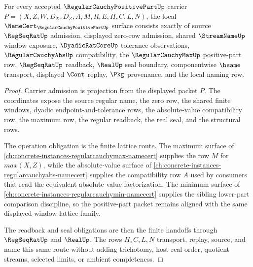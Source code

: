 \begin{theorem}
\label{thm:regular-cauchy-positive-part-namecert-obligations}
For every accepted $\RegularCauchyPositivePartUp$ carrier $P=(X,Z,W,D_X,D_Z,A,M,R,E,H,C,L,N)$, the local $\NameCert_{\RegularCauchyPositivePartUp}$ surface consists exactly of source $\RegSeqRatUp$ admission, displayed zero-row admission, shared $\StreamNameUp$ window exposure, $\DyadicRatCoreUp$ tolerance observations, $\RegularCauchyAbsUp$ compatibility, the $\RegularCauchyMaxUp$ positive-part row, $\RegSeqRatUp$ readback, $\RealUp$ seal boundary, componentwise $\hsame$ transport, displayed $\Cont$ replay, $\Pkg$ provenance, and the local naming row.
\end{theorem}
\begin{proof}
Carrier admission is projection from the displayed packet $P$. The coordinates expose the source regular name, the zero row, the shared finite windows, dyadic endpoint-and-tolerance rows, the absolute-value compatibility row, the maximum row, the regular readback, the real seal, and the structural rows.

The operation obligation is the finite lattice route. The maximum surface of \autoref{ch:concrete-instances-regularcauchymax-namecert} supplies the row $M$ for $max(X,Z)$, while the absolute-value surface of \autoref{ch:concrete-instances-regularcauchyabs-namecert} supplies the compatibility row $A$ used by consumers that read the equivalent absolute-value factorization. The minimum surface of \autoref{ch:concrete-instances-regularcauchymin-namecert} supplies the sibling lower-part comparison discipline, so the positive-part packet remains aligned with the same displayed-window lattice family.

The readback and seal obligations are then the finite handoffs through $\RegSeqRatUp$ and $\RealUp$. The rows $H,C,L,N$ transport, replay, source, and name this same route without adding trichotomy, host real order, quotient streams, selected limits, or ambient completeness.
\end{proof}

